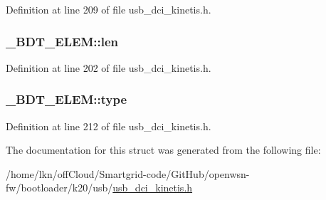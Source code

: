 Definition at line 209 of file usb\+\_\+dci\+\_\+kinetis.\+h.

\subsubsection[{\texorpdfstring{len}{len}}]{ \+\_\+\+B\+D\+T\+\_\+\+E\+L\+E\+M\+::len}\hypertarget{struct___b_d_t___e_l_e_m_a87471c8e8ecbecc4fec59fd72ad6ef37}{}\label{struct___b_d_t___e_l_e_m_a87471c8e8ecbecc4fec59fd72ad6ef37}


Definition at line 202 of file usb\+\_\+dci\+\_\+kinetis.\+h.

\subsubsection[{\texorpdfstring{type}{type}}]{ \+\_\+\+B\+D\+T\+\_\+\+E\+L\+E\+M\+::type}\hypertarget{struct___b_d_t___e_l_e_m_a2b6afaa8500c6c5f578d00605bd0b8bc}{}\label{struct___b_d_t___e_l_e_m_a2b6afaa8500c6c5f578d00605bd0b8bc}


Definition at line 212 of file usb\+\_\+dci\+\_\+kinetis.\+h.



The documentation for this struct was generated from the following file\+:\begin{DoxyCompactItemize}
\item 
/home/lkn/off\+Cloud/\+Smartgrid-\/code/\+Git\+Hub/openwsn-\/fw/bootloader/k20/usb/\hyperlink{usb__dci__kinetis_8h}{usb\+\_\+dci\+\_\+kinetis.\+h}\end{DoxyCompactItemize}
